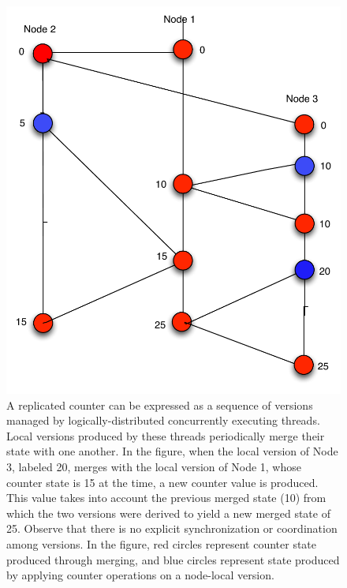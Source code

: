 \begin{figure}
  \begin{center}
    \includegraphics[scale=0.4]{Figures/dali-counter}
  \end{center}
  \caption{\small A replicated counter can be expressed as a sequence
    of versions managed by logically-distributed concurrently
    executing threads.  Local versions produced by these threads
    periodically merge their state with one another.  In the figure,
    when the local version of Node 3, labeled 20, merges with the
    local version of Node 1, whose counter state is 15 at the time, a
    new counter value is produced.  This value takes into account the
    previous merged state (10) from which the two versions were
    derived to yield a new merged state of 25.  Observe that there is
    no explicit synchronization or coordination among versions.  In
    the figure, red circles represent counter state produced through
    merging, and blue circles represent state produced by applying
    counter operations on a node-local version.  }
\vspace*{-.85in}  
\end{figure}
